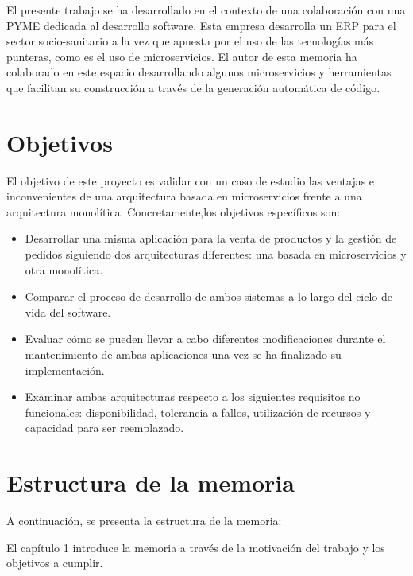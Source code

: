 \documentclass[11pt,spanish,listoffigures]{tfgetsinf}
\begin{document}
El presente trabajo se ha desarrollado en el contexto de una colaboración con una PYME dedicada al desarrollo software. Esta empresa desarrolla un ERP para el sector socio-sanitario a la vez que apuesta por el uso de las tecnologías más punteras, como es el uso de microservicios. El autor de esta memoria ha colaborado en este espacio desarrollando algunos microservicios y herramientas que facilitan su construcción a través de la generación automática de código.

\section{Objetivos}

El objetivo de este proyecto es validar con un caso de estudio las ventajas e inconvenientes de una arquitectura basada en microservicios frente a una arquitectura monolítica. Concretamente,los objetivos específicos son:

\begin{itemize}

\item Desarrollar una misma aplicación para la venta de productos y la gestión de pedidos siguiendo dos arquitecturas diferentes: una basada en microservicios y otra monolítica.

\item Comparar el proceso de desarrollo de ambos sistemas a lo largo del ciclo de vida del software.

\item Evaluar cómo se pueden llevar a cabo diferentes modificaciones durante el mantenimiento de ambas aplicaciones una vez se ha finalizado su implementación.

\item Examinar ambas arquitecturas respecto a los siguientes requisitos no funcionales: disponibilidad, tolerancia a fallos, utilización de recursos y capacidad para ser reemplazado.

\end{itemize}

\section{Estructura de la memoria}

A continuación, se presenta la estructura de la memoria:

El capítulo 1 introduce la memoria a través de la motivación del trabajo y los objetivos a cumplir.
\end{document}
